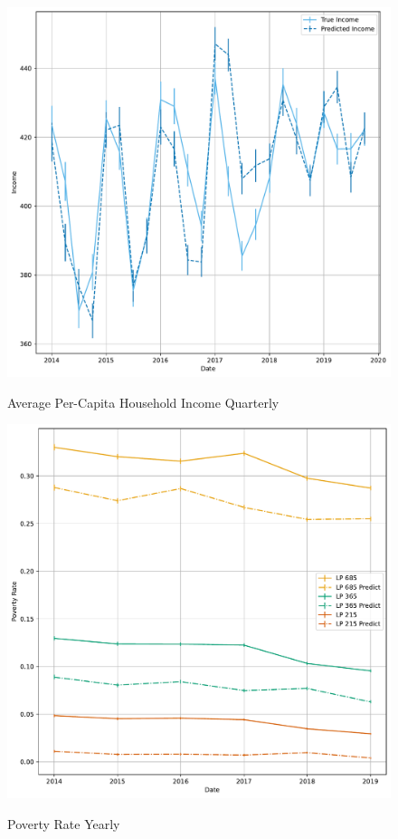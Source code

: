 \begin{figure}[H]
    \centering
    \caption{Average Per-Capita  Household Income Quarterly}
    \includegraphics[width=\textwidth]{../figures/fig7_average_income_time_series_quarterly.pdf}
    \label{fig:enter-label}
\end{figure}


\begin{figure}[H]
    \centering
    \caption{Poverty Rate Yearly}
    \includegraphics[width=\textwidth]{../figures/fig8_poverty_rate_time_series.pdf}
    \label{fig:enter-label}
\end{figure}




